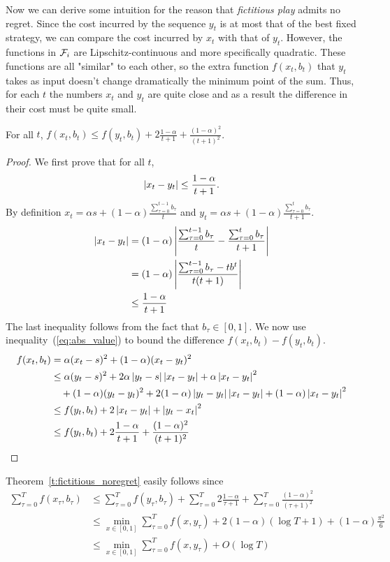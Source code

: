 Now we can derive some intuition for the reason that \emph{fictitious play}
admits no regret. Since the cost incurred by the sequence $y_t$ is at most that
of the best fixed strategy, we can compare the cost incurred by $x_t$ with
that of $y_t$.  However, the functions in $\mathcal{F}_i$ are Lipschitz-continuous and more
specifically quadratic.
These functions are all "similar" to each other, so the extra function $f(x_t,b_t)$ that $y_t$ takes
as input doesn't change dramatically the minimum point of the sum.
Thus, for each $t$ the numbers $x_t$ and $y_t$ are quite
close and as a result the difference in their cost must be quite small.

\begin{lemma}
  For all $t$,
  \(f(x_t,b_t) \leq f(y_t,b_t) + 2\frac{1-\alpha}{t+1} + \frac{(1-\alpha)^2}{(t+1)^2}\).
\end{lemma}
\begin{proof}
  We first prove that for all $t$,
  \begin{equation}\label{eq:abs_value}
    \left|x_t - y_t \right| \leq \frac{1-\alpha}{t+1}.
  \end{equation}
  By definition
  \(x_t = \alpha s + (1-\alpha)\frac{\sum_{\tau = 0}^{t-1} b_\tau}{t}\)
  and
  \( y_t = \alpha s + (1-\alpha)\frac{\sum_{\tau = 0}^t b_\tau}{t+1}\).
  \begin{align*}
    \left|x_t - y_t\right|
    &=
    (1-\alpha)\left|\frac{\sum_{\tau = 0}^{t-1}b_\tau}{t}
    - \frac{\sum_{\tau = 0}^t b_\tau}{t+1}\right|\\
    &=
    (1-\alpha)\left|\frac{\sum_{\tau = 0}^{t-1}b_\tau -tb^t}{t(t+1)}\right|\\
    &\leq
    \frac{1-\alpha}{t+1}
  \end{align*}
  The last inequality follows from the fact that $b_\tau \in [0,1]$.
  We now use inequality~(\ref{eq:abs_value}) to bound the difference
  \( f(x_t,b_t) - f(y_t,b_t) \).
  \begin{align*}
    f(x_t,b_t)
    &=
    \alpha(x_t - s)^2 + (1 - \alpha)(x_t - y_t)^2 \\
    &\leq
    \alpha(y_t - s)^2 + 2\alpha\left|y_t -
    s\right|\left|x_t - y_t\right| + \alpha \left|x_t - y_t\right|^2 \\
    &\quad + (1-\alpha)(y_t - y_t)^2 +
    2(1-\alpha)\left|y_t - y_t\right|\left|x_t-y_t\right| + (1 - \alpha)\left|x_t - y_t\right|^2\\
    &\leq
    f(y_t,b_t) + 2\left|x_t - y_t\right| + \left|y_t - x_t\right|^2\\
    &\leq
    f(y_t,b_t) + 2\frac{1-\alpha}{t+1} + \frac{(1-\alpha)^2}{(t+1)^2}
  \end{align*}
\end{proof}

Theorem~\ref{t:fictitious_noregret} easily follows since
\begin{align*}
  \sum_{\tau=0}^T f(x_\tau,b_\tau)
  &\leq
  \sum_{\tau=0}^T f(y_\tau,b_\tau) + \sum_{\tau=0}^T 2\frac{1-\alpha}{\tau+1} +
  \sum_{\tau=0}^T \frac{(1-\alpha)^2}{(\tau+1)^2}\\
  &\leq
  \min_{ x \in [0,1]} \sum_{\tau=0}^T f(x,y_\tau) +
  2(1-\alpha)(\log T + 1) + (1-\alpha)\frac{\pi^2}{6}\\
  &\leq
  \min_{ x \in [0,1]} \sum_{\tau=0}^T f(x,y_\tau) + O(\log T)
\end{align*}

